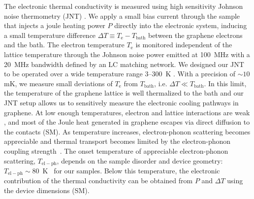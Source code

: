 The electronic thermal conductivity is measured using high sensitivity Johnson noise thermometry (JNT) \cite{fong_ultrasensitive_2012, crossno_development_2015}. We apply a small bias current through the sample that injects a joule heating power $P$ directly into the electronic system, inducing a small temperature difference $\Delta T\equiv T_{\mathrm{e}}-T_{\mathrm{bath}}$ between the graphene electrons and the bath. The electron temperature $T_{\mathrm{e}}$ is monitored independent of the lattice temperature through the Johnson noise power emitted at 100~MHz with a 20~MHz bandwidth defined by an LC matching network. We designed our JNT to be operated over a wide temperature range 3--300~K \cite{crossno_development_2015}. With a precision of $\sim 10$ mK, we measure small deviations of $T_{\mathrm{e}}$ from $T_{\mathrm{bath}}$, i.e. $\Delta T\ll T_{\mathrm{bath}}$. In this limit, the temperature of the graphene lattice is well thermalized to the bath \cite{fong_ultrasensitive_2012} and our JNT setup allows us to sensitively measure the electronic cooling pathways in graphene. At low enough temperatures, electron and lattice interactions are weak \cite{crossno_development_2015, fong_measurement_2013}, and most of the Joule heat generated in graphene escapes via direct diffusion to the contacts (SM). As temperature increases, electron-phonon scattering becomes appreciable and thermal transport becomes limited by the electron-phonon coupling strength~\cite{fong_measurement_2013, betz_hot_2012, mckitterick_electron-phonon_2015}. The onset temperature of appreciable electron-phonon scattering, $T_{\mathrm{el-ph}}$, depends on the sample disorder and device geometry: $T_{\mathrm{el-ph}}\sim$80~K~\cite{fong_measurement_2013, crossno_development_2015, yigen_wiedemann-franz_2014, laitinen_electron-phonon_2014} for our samples. Below this temperature, the electronic contribution of the thermal conductivity can be obtained from $P$ and $\Delta T$ using the device dimensions (SM).

